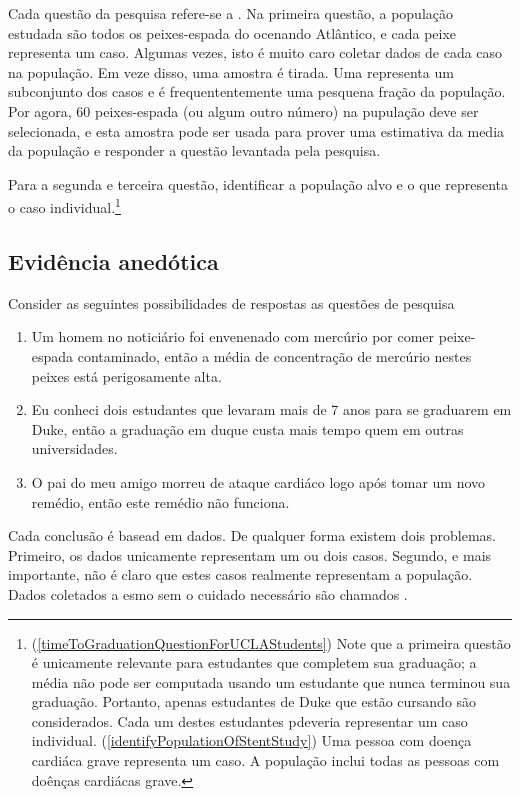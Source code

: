 Cada questão da pesquisa refere-se a . Na primeira questão, a população estudada são todos os peixes-espada do ocenando Atlântico, e cada peixe representa um caso. Algumas vezes, isto é muito caro coletar dados de cada caso na população. Em veze disso, uma amostra é tirada. Uma  representa um subconjunto dos casos e é frequententemente uma pesquena fração da população. Por agora, 60 peixes-espada (ou algum outro número) na pupulação deve ser selecionada, e esta amostra pode ser usada para prover uma estimativa da media da população e responder a questão levantada pela pesquisa.

\begin{exercise} \label{identifyingThePopulationForTwoQuestionsInPopAndSampSubsection}
    Para a segunda e terceira questão, identificar a população alvo e o que representa o caso individual.\footnote{(\ref{timeToGraduationQuestionForUCLAStudents}) Note que a primeira questão é unicamente relevante para estudantes que completem sua graduação; a média não pode ser computada usando um estudante que nunca terminou sua graduação. Portanto, apenas estudantes de Duke que estão cursando são considerados. Cada um destes estudantes pdeveria representar um caso individual. (\ref{identifyPopulationOfStentStudy}) Uma pessoa com doença cardiáca grave representa um caso. A população inclui todas as pessoas com doênças cardiácas grave.}
\end{exercise}

\subsection{Evidência anedótica}
\label{anecdotalEvidenceSubsection}

Consider as seguintes possibilidades de respostas  as questões de pesquisa
\begin{enumerate}

\item Um homem no noticiário foi envenenado com mercúrio por comer peixe-espada contaminado, então a média de concentração de mercúrio nestes peixes está perigosamente alta.
\item\label{iKnowThreeStudentsWhoTookMoreThan7YearsToGraduateAtDuke} Eu conheci dois estudantes que levaram mais de 7 anos para se graduarem em Duke, então a graduação em duque custa mais tempo quem em outras universidades.

\item\label{myFriendsDadDiedAfterSulphinpyrazon} O pai do meu amigo morreu de ataque cardiáco logo após tomar um novo remédio, então este remédio não funciona.
\end{enumerate}
Cada conclusão é basead em dados. De qualquer forma existem dois problemas. Primeiro, os dados unicamente representam um ou dois casos. Segundo, e mais importante, não é claro que estes casos realmente representam a população. Dados coletados a esmo sem o cuidado necessário são chamados .

